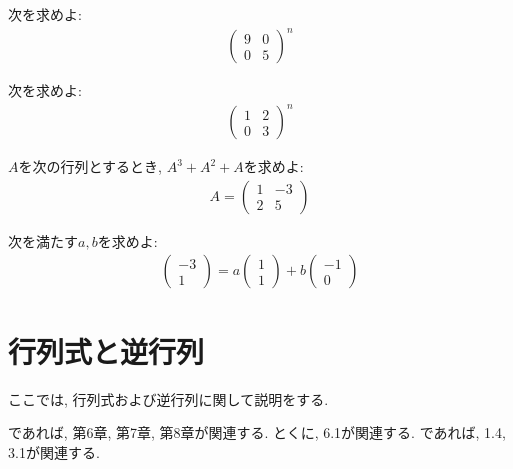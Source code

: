 \begin{quiz}
  次を求めよ:
  \begin{align*}
    \begin{pmatrix}
      9&0\\0&5
    \end{pmatrix}^n
  \end{align*}
\end{quiz}

\begin{quiz}
  次を求めよ:
  \begin{align*}
    \begin{pmatrix}
      1&2\\0&3
    \end{pmatrix}^n
  \end{align*}
\end{quiz}


\begin{quiz}
  $A$を次の行列とするとき, $A^3+A^2+A$を求めよ:
  \begin{align*}
    A=
    \begin{pmatrix}
      1&-3\\2&5
    \end{pmatrix}
  \end{align*}
\end{quiz}

\begin{quiz}
  次を満たす$a,b$を求めよ:
  \begin{align*}
    \begin{pmatrix}
      -3\\1
    \end{pmatrix}
    =
    a\begin{pmatrix}
      1\\1
    \end{pmatrix}
    +b\begin{pmatrix}
      -1\\0
    \end{pmatrix}
  \end{align*}
\end{quiz}

\chapter{行列式と逆行列}
\label{chap:inverse}
ここでは,
行列式および逆行列に関して説明をする.

\cite{978-4-7806-0772-7}であれば,
第6章, 第7章, 第8章が関連する.
とくに, 6.1が関連する.
\cite{978-4-7806-0164-0}であれば,
1.4, 3.1が関連する.

